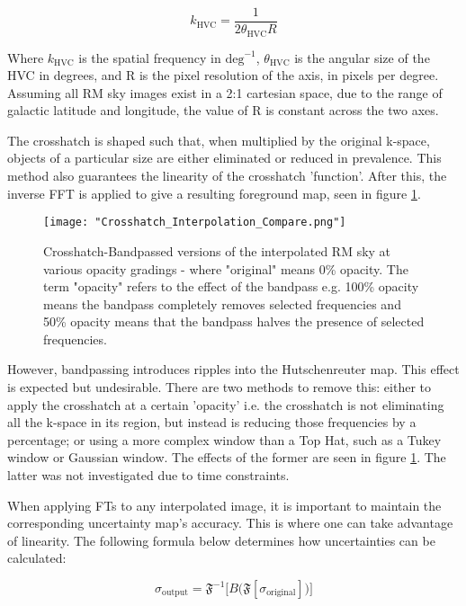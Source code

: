 \begin{equation}
        k_{\mathrm{HVC}} = \frac{1}{2 \theta_{\mathrm{HVC}} R}
    \label{eq:freq_to_angle}
\end{equation}


Where $k_{\mathrm{HVC}}$ is the spatial frequency in $\mathrm{deg}^{-1}$, $\theta_{\mathrm{HVC}}$ is the angular size of the HVC in degrees, and R is the pixel resolution of the axis, in pixels per degree. Assuming all RM sky images exist in a 2:1 cartesian space, due to the range of galactic latitude and longitude, the value of R is constant across the two axes.


The crosshatch is shaped such that, when multiplied by the original k-space, objects of a particular size are either eliminated or reduced in prevalence. This method also guarantees the linearity of the crosshatch 'function'. After this, the inverse FFT is applied to give a resulting foreground map, seen in figure \ref{fig:ripples}.

\begin{figure}
    \texttt{[image: "Crosshatch\_Interpolation\_Compare.png"]}
    \centering
    \caption{Crosshatch-Bandpassed versions of the interpolated RM sky at various opacity gradings - where "original" means 0\% opacity. The term "opacity" refers to the effect of the bandpass e.g. 100\% opacity means the bandpass completely removes selected frequencies and 50\% opacity means that the bandpass halves the presence of selected frequencies.}
    \label{fig:ripples}
\end{figure}


However, bandpassing introduces ripples into the Hutschenreuter map. This effect is expected but undesirable. There are two methods to remove this: either to apply the crosshatch at a certain 'opacity' i.e. the crosshatch is not eliminating all the k-space in its region, but instead is reducing those frequencies by a percentage; or using a more complex window than a Top Hat, such as a Tukey window or Gaussian window. The effects of the former are seen in figure \ref{fig:ripples}. The latter was not investigated due to time constraints.


When applying FTs to any interpolated image, it is important to maintain the corresponding uncertainty map's accuracy. This is where one can take advantage of linearity. The following formula below determines how uncertainties can be calculated:


\begin{equation}
    \sigma_{\mathrm{output}} = \mathbf{\mathfrak{F}}^{-1} \biggl[ B \bigl( \mathbf{\mathfrak{F}} \left[ \sigma_{\mathrm{original}} \right] \bigr) \biggr]
    \label{eq:ft_unc}
\end{equation}


